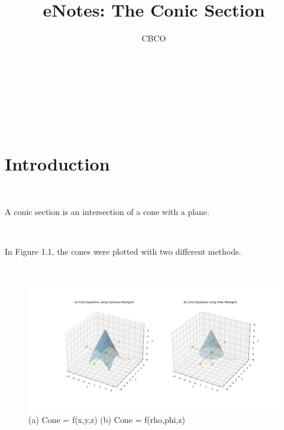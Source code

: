 \documentclass[10pt,a4paper,leqno]{article}
\author{CBCO}
\title{eNotes: The Conic Section}
\date{}
\begin{document}
\maketitle

\noindent {} %
\renewcommand{\theequation}{\thesection.\arabic{equation}}  
 \par \ \par\noindent {}
 \par \ \par\noindent \begin{CJK*}{UTF8}{gbsn}
 \par \ \par\noindent \section{Introduction }
 \par \ \par\noindent A conic section is an intersection of a cone with a plane.
 \par \ \par\noindent In Figure 1.1, the cones were plotted with two different methods.
 \par \ \par\begin{figure}[H]
\centering\includegraphics[width=1\linewidth,height=0.7\textheight]{Data/fgr01.png}
\caption{(a) Cone = f(x,y,z)  (b) Cone = f(rho,phi,z) }
\label{fig:Data/fgr01.png}
\end{figure}


\end{CJK*}
\end{document}

